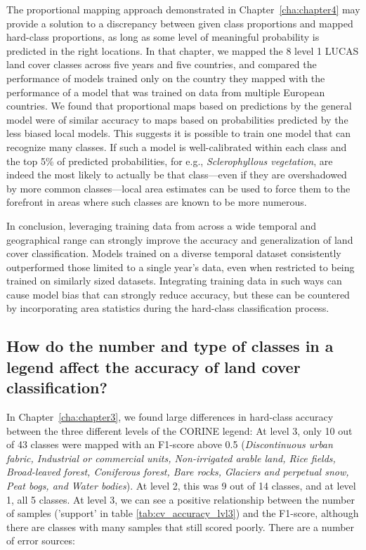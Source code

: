         The proportional mapping approach demonstrated in Chapter\@~\ref{cha:chapter4} may provide a solution to a discrepancy between given class proportions and mapped hard-class proportions, as long as some level of meaningful probability is predicted in the right locations. In that chapter, we mapped the 8 level 1 LUCAS land cover classes across five years and five countries, and compared the performance of models trained only on the country they mapped with the performance of a model that was trained on data from multiple European countries. We found that proportional maps based on predictions by the general model were of similar accuracy to maps based on probabilities predicted by the less biased local models. This suggests it is possible to train one model that can recognize many classes. If such a model is well-calibrated within each class and the top 5\% of predicted probabilities, for e.g., \textit{Sclerophyllous vegetation}, are indeed the most likely to actually be that class---even if they are overshadowed by more common classes---local area estimates can be used to force them to the forefront in areas where such classes are known to be more numerous. 

        In conclusion, leveraging training data from across a wide temporal and geographical range can strongly improve the accuracy and generalization of land cover classification. Models trained on a diverse temporal dataset consistently outperformed those limited to a single year's data, even when restricted to being trained on similarly sized datasets. Integrating training data in such ways can cause model bias that can strongly reduce accuracy, but these can be countered by incorporating area statistics during the hard-class classification process.
        
    \subsection{How do the number and type of classes in a legend affect the accuracy of land cover classification?}
    \label{syn:rq3}

        In Chapter\@~\ref{cha:chapter3}, we found large differences in hard-class accuracy between the three different levels of the CORINE legend: At level 3, only 10 out of 43 classes were mapped with an F1-score above 0.5 (\textit{Discontinuous urban fabric, Industrial or commercial units, Non-irrigated arable land, Rice fields, Broad-leaved forest, Coniferous forest, Bare rocks, Glaciers and perpetual snow, Peat bogs, and Water bodies}). At level 2, this was 9 out of 14 classes, and at level 1, all 5 classes. At level 3, we can see a positive relationship between the number of samples ('support' in table \ref{tab:cv_accuracy_lvl3}) and the F1-score, although there are classes with many samples that still scored poorly. There are a number of error sources: 


